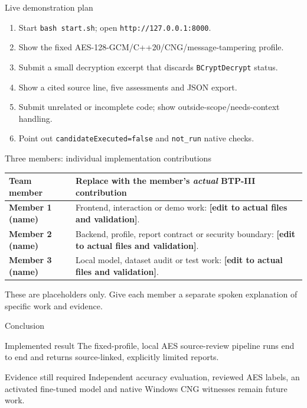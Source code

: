 \documentclass[aspectratio=169,10pt]{beamer}
\newcommand{\mone}{Member 1 (name)}
\newcommand{\mtwo}{Member 2 (name)}
\newcommand{\mthree}{Member 3 (name)}
\begin{document}
\begin{frame}{Live demonstration plan}
\begin{enumerate}
\item Start \texttt{bash start.sh}; open \texttt{http://127.0.0.1:8000}.
\item Show the fixed AES-128-GCM/C++20/CNG/message-tampering profile.
\item Submit a small decryption excerpt that discards \texttt{BCryptDecrypt} status.
\item Show a cited source line, five assessments and JSON export.
\item Submit unrelated or incomplete code; show outside-scope/needs-context handling.
\item Point out \texttt{candidateExecuted=false} and \texttt{not\_run} native checks.
\end{enumerate}
\end{frame}

\begin{frame}{Three members: individual implementation contributions}
\small
\begin{tabularx}{\textwidth}{>{\bfseries}p{2.7cm}X}
\toprule
Team member & Replace with the member's \emph{actual} BTP-III contribution \\
\midrule
\mone & Frontend, interaction or demo work: \textbf{[edit to actual files and validation]}. \\
\mtwo & Backend, profile, report contract or security boundary: \textbf{[edit to actual files and validation]}. \\
\mthree & Local model, dataset audit or test work: \textbf{[edit to actual files and validation]}. \\
\bottomrule
\end{tabularx}
\vspace{0.6em}
{\scriptsize These are placeholders only. Give each member a separate spoken explanation of specific work and evidence.}
\end{frame}

\begin{frame}{Conclusion}
\begin{block}{Implemented result}
The fixed-profile, local AES source-review pipeline runs end to end and returns source-linked, explicitly limited reports.
\end{block}
\begin{block}{Evidence still required}
Independent accuracy evaluation, reviewed AES labels, an activated fine-tuned model and native Windows CNG witnesses remain future work.
\end{block}
\end{frame}
\end{document}
